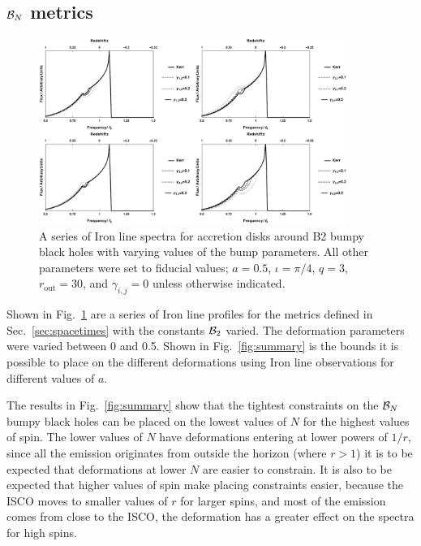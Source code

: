 \subsection{${\cal{B}}_{N}$ metrics}\label{subsubsec:B2res}

\begin{figure}[t]
 \centering
 \includegraphics[trim=0cm 0cm 0cm 0cm, width=0.9\textwidth]{B2IronLines.pdf}
 \caption{A series of Iron line spectra for accretion disks around B2 bumpy black holes with varying values of the bump parameters. All other parameters were set to fiducial values; $a=0.5$, $\iota=\pi/4$, $q=3$, $r_{\textrm{out}}=30$, and $\gamma_{i,j}=0$ unless otherwise indicated.}
 \label{fig:B2Line}
\end{figure}

Shown in Fig.~\ref{fig:B2Line} are a series of Iron line profiles for the metrics defined in Sec.\ \ref{sec:spacetimes} with the constants ${\cal{B}}_{2}$ varied. The deformation parameters were varied between 0 and 0.5. Shown in Fig.~\ref{fig:summary} is the bounds it is possible to place on the different deformations using Iron line observations for different values of $a$.

The results in Fig.~\ref{fig:summary} show that the tightest constraints on the ${\cal{B}}_{N}$ bumpy black holes can be placed on the lowest values of $N$ for the highest values of spin. The lower values of $N$ have deformations entering at lower powers of $1/r$, since all the emission originates from outside the horizon (where $r>1$) it is to be expected that deformations at lower $N$ are easier to constrain. It is also to be expected that higher values of spin make placing constraints easier, because the ISCO moves to smaller values of $r$ for larger spins, and most of the emission comes from close to the ISCO, the deformation has a greater effect on the spectra for high spins.

